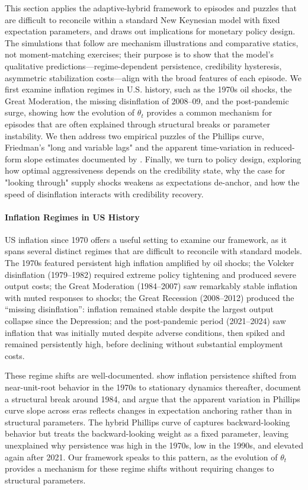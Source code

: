 \documentclass[10pt]{article}
\begin{document}
This section applies the adaptive-hybrid framework to episodes and puzzles that are difficult to reconcile within a standard New Keynesian model with fixed expectation parameters, and draws out implications for monetary policy design. The simulations that follow are mechanism illustrations and comparative statics, not moment-matching exercises; their purpose is to show that the model's qualitative predictions---regime-dependent persistence, credibility hysteresis, asymmetric stabilization costs---align with the broad features of each episode. We first examine inflation regimes in U.S. history, such as the 1970s oil shocks, the Great Moderation, the missing disinflation of 2008–09, and the post-pandemic surge, showing how the evolution of $\theta_t$ provides a common mechanism for episodes that are often explained through structural breaks or parameter instability. We then address two empirical puzzles of the Phillips curve, Friedman's "long and variable lags" and the apparent time-variation in reduced-form slope estimates documented by \citet{mavroeidis2014empirical}. Finally, we turn to policy design, exploring how optimal aggressiveness depends on the credibility state, why the case for "looking through" supply shocks weakens as expectations de-anchor, and how the speed of disinflation interacts with credibility recovery.

\paragraph{Inflation Regimes in US History} US inflation since 1970 offers a useful setting to examine our framework, as it spans several distinct regimes that are difficult to reconcile with standard models. The 1970s featured persistent high inflation amplified by oil shocks; the Volcker disinflation (1979--1982) required extreme policy tightening and produced severe output costs; the Great Moderation (1984--2007) saw remarkably stable inflation with muted responses to shocks; the Great Recession (2008--2012) produced the ``missing disinflation'': inflation remained stable despite the largest output collapse since the Depression; and the post-pandemic period (2021--2024) saw inflation that was initially muted despite adverse conditions, then spiked and remained persistently high, before declining without substantial employment costs.

These regime shifts are well-documented. \citet{cogley2005drifts} show inflation persistence shifted from near-unit-root behavior in the 1970s to stationary dynamics thereafter, \citet{stock2007has} document a structural break around 1984, and \citet{hazell2022slope} argue that the apparent variation in Phillips curve slope across eras reflects changes in expectation anchoring rather than in structural parameters. The hybrid Phillips curve of \citet{gali1999} captures backward-looking behavior but treats the backward-looking weight as a fixed parameter, leaving unexplained why persistence was high in the 1970s, low in the 1990s, and elevated again after 2021. Our framework speaks to this pattern, as the evolution of $\theta_t$ provides a mechanism for these regime shifts without requiring changes to structural parameters.
\end{document}

